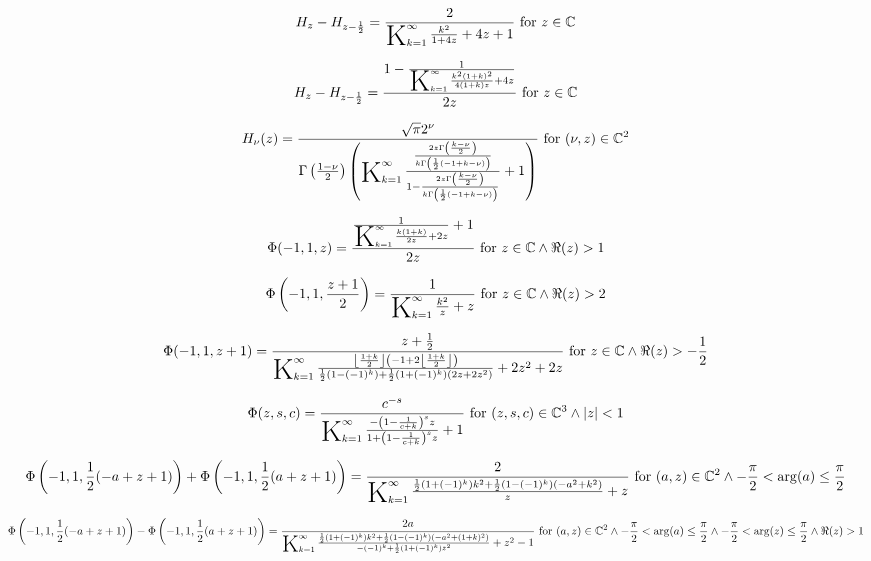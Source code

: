 \documentclass{article}
\newcommand{\bigK}{\mathop{\raisebox{-5pt}{\huge K}}}
\begin{document}
\[H_z-H_{z-\frac{1}{2}}=\frac{2}{\bigK_{k=1}^{\infty}\frac{k^2}{1+4 z}+4 z+1}\text{ for }z\in \mathbb{C}\] 

\[H_z-H_{z-\frac{1}{2}}=\frac{1-\frac{1}{\bigK_{k=1}^{\infty}\frac{k^2 (1+k)^2}{4 (1+k) z}+4 z}}{2 z}\text{ for }z\in \mathbb{C}\] 

\[H_{\nu }(z)=\frac{\sqrt{\pi } 2^{\nu }}{\Gamma \left(\frac{1-\nu }{2}\right) \left(\bigK_{k=1}^{\infty}\frac{\frac{2 z \Gamma \left(\frac{k-\nu }{2}\right)}{k \Gamma \left(\frac{1}{2} (-1+k-\nu )\right)}}{1-\frac{2 z \Gamma \left(\frac{k-\nu }{2}\right)}{k \Gamma \left(\frac{1}{2} (-1+k-\nu )\right)}}+1\right)}\text{ for }(\nu ,z)\in \mathbb{C}^2\] 

\[\Phi (-1,1,z)=\frac{\frac{1}{\bigK_{k=1}^{\infty}\frac{k (1+k)}{2 z}+2 z}+1}{2 z}\text{ for }z\in \mathbb{C}\land \Re(z)>1\] 

\[\Phi \left(-1,1,\frac{z+1}{2}\right)=\frac{1}{\bigK_{k=1}^{\infty}\frac{k^2}{z}+z}\text{ for }z\in \mathbb{C}\land \Re(z)>2\] 

\[\Phi (-1,1,z+1)=\frac{z+\frac{1}{2}}{\bigK_{k=1}^{\infty}\frac{\left\lfloor \frac{1+k}{2}\right\rfloor  \left(-1+2 \left\lfloor \frac{1+k}{2}\right\rfloor \right)}{\frac{1}{2} \left(1-(-1)^k\right)+\frac{1}{2} \left(1+(-1)^k\right) \left(2 z+2 z^2\right)}+2 z^2+2 z}\text{ for }z\in \mathbb{C}\land \Re(z)>-\frac{1}{2}\] 

\[\Phi (z,s,c)=\frac{c^{-s}}{\bigK_{k=1}^{\infty}\frac{-\left(1-\frac{1}{c+k}\right)^s z}{1+\left(1-\frac{1}{c+k}\right)^s z}+1}\text{ for }(z,s,c)\in \mathbb{C}^3\land \left| z\right| <1\] 

\[\Phi \left(-1,1,\frac{1}{2} (-a+z+1)\right)+\Phi \left(-1,1,\frac{1}{2} (a+z+1)\right)=\frac{2}{\bigK_{k=1}^{\infty}\frac{\frac{1}{2} \left(1+(-1)^k\right) k^2+\frac{1}{2} \left(1-(-1)^k\right) \left(-a^2+k^2\right)}{z}+z}\text{ for }(a,z)\in \mathbb{C}^2\land -\frac{\pi }{2}<\arg (a)\leq \frac{\pi }{2}\] 

\[\Phi \left(-1,1,\frac{1}{2} (-a+z+1)\right)-\Phi \left(-1,1,\frac{1}{2} (a+z+1)\right)=\frac{2 a}{\bigK_{k=1}^{\infty}\frac{\frac{1}{2} \left(1+(-1)^k\right) k^2+\frac{1}{2} \left(1-(-1)^k\right) \left(-a^2+(1+k)^2\right)}{-(-1)^k+\frac{1}{2} \left(1+(-1)^k\right) z^2}+z^2-1}\text{ for }(a,z)\in \mathbb{C}^2\land -\frac{\pi }{2}<\arg (a)\leq \frac{\pi }{2}\land -\frac{\pi }{2}<\arg (z)\leq \frac{\pi }{2}\land \Re(z)>1\] 
\end{document}
